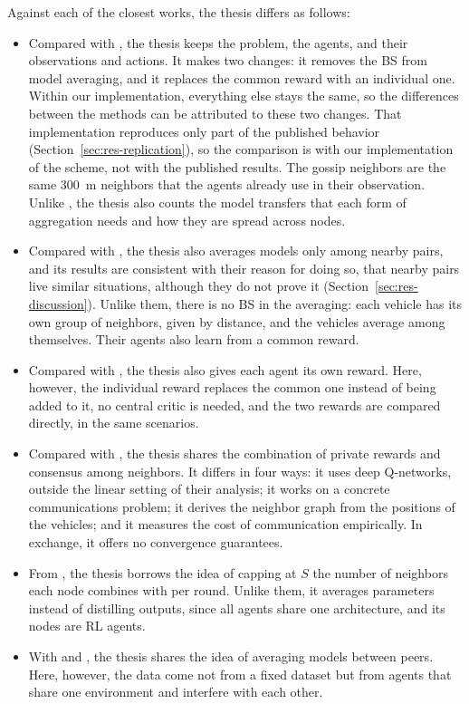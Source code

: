 Against each of the closest works, the thesis differs as follows:
\begin{itemize}
  \item Compared with \citet{li+22fedmarl}, the thesis keeps the problem, the agents, and their
    observations and actions. It makes two changes: it removes the \ac{BS} from model averaging, and it
    replaces the common reward with an individual one. Within our implementation, everything else stays the
    same, so the differences between the methods can be attributed to these two changes. That
    implementation reproduces only part of the published behavior (Section~\ref{sec:res-replication}), so
    the comparison is with our implementation of the scheme, not with the published results. The gossip
    neighbors are the same \SI{300}{\meter} neighbors that the agents already use in their observation.
    Unlike \citet{li+22fedmarl}, the thesis also counts the model transfers that each form of aggregation
    needs and how they are spread across nodes.
  \item Compared with \citet{zhang+20v2xfed}, the thesis also averages models only among nearby pairs, and
    its results are consistent with their reason for doing so, that nearby pairs live similar situations,
    although they do not prove it (Section~\ref{sec:res-discussion}). Unlike them, there is no \ac{BS} in
    the averaging: each vehicle has its own group of neighbors, given by distance, and the vehicles
    average among themselves. Their agents also learn from a common reward.
  \item Compared with \citet{parvini+23aoi}, the thesis also gives each agent its own reward. Here,
    however, the individual reward replaces the common one instead of being added to it, no central critic
    is needed, and the two rewards are compared directly, in the same scenarios.
  \item Compared with \citet{zhang+18networked}, the thesis shares the combination of private rewards and
    consensus among neighbors. It differs in four ways: it uses deep Q-networks, outside the linear
    setting of their analysis; it works on a concrete communications problem; it derives the neighbor
    graph from the positions of the vehicles; and it measures the cost of communication empirically. In
    exchange, it offers no convergence guarantees.
  \item From \citet{ge+24dfl}, the thesis borrows the idea of capping at $S$ the number of neighbors each
    node combines with per round. Unlike them, it averages parameters instead of distilling outputs, since
    all agents share one architecture, and its nodes are \ac{RL} agents.
  \item With \citet{lian+17dpsgd} and \citet{hegedus+19gossip}, the thesis shares the idea of averaging
    models between peers. Here, however, the data come not from a fixed dataset but from agents that share
    one environment and interfere with each other.
\end{itemize}
